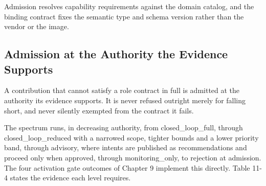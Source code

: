Admission resolves capability requirements against the domain catalog,
and the binding contract fixes the semantic type and schema version
rather than the vendor or the image.

\hypertarget{admission-at-the-authority-the-evidence-supports}{%
\subsection{Admission at the Authority the Evidence Supports}\label{admission-at-the-authority-the-evidence-supports}}

A contribution that cannot satisfy a role contract in full is admitted
at the authority its evidence supports. It is never refused outright
merely for falling short, and never silently exempted from the contract
it fails.

The spectrum runs, in decreasing authority, from
closed\_\allowbreak{}loop\_\allowbreak{}full, through
closed\_\allowbreak{}loop\_\allowbreak{}reduced with a narrowed scope,
tighter bounds and a lower priority band, through advisory, where
intents are published as recommendations and proceed only when approved,
through monitoring\_\allowbreak{}only, to rejection at admission. The
four activation gate outcomes of Chapter 9 implement this directly.
Table 11-4 states the evidence each level requires.

